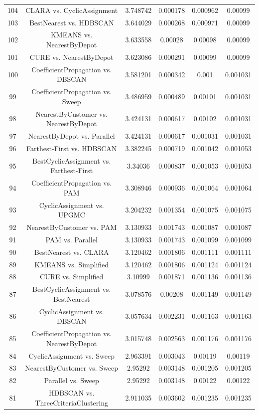 \documentclass[a4paper,10pt]{article}
\begin{document}
\begin{landscape}
\begin{table}[!htp]
\begin{tabular}{cccccc}
104&CLARA vs. CyclicAssignment&3.748742&0.000178&0.000962&0.00099\\
103&BestNearest vs. HDBSCAN&3.644029&0.000268&0.000971&0.00099\\
102&KMEANS vs. NearestByDepot&3.633558&0.00028&0.00098&0.00099\\
101&CURE vs. NearestByDepot&3.623086&0.000291&0.00099&0.00099\\
100&CoefficientPropagation vs. DBSCAN&3.581201&0.000342&0.001&0.001031\\
99&CoefficientPropagation vs. Sweep&3.486959&0.000489&0.00101&0.001031\\
98&NearestByCustomer vs. NearestByDepot&3.424131&0.000617&0.00102&0.001031\\
97&NearestByDepot vs. Parallel&3.424131&0.000617&0.001031&0.001031\\
96&Farthest-First vs. HDBSCAN&3.382245&0.000719&0.001042&0.001053\\
95&BestCyclicAssignment vs. Farthest-First&3.34036&0.000837&0.001053&0.001053\\
94&CoefficientPropagation vs. PAM&3.308946&0.000936&0.001064&0.001064\\
93&CyclicAssignment vs. UPGMC&3.204232&0.001354&0.001075&0.001075\\
92&NearestByCustomer vs. PAM&3.130933&0.001743&0.001087&0.001087\\
91&PAM vs. Parallel&3.130933&0.001743&0.001099&0.001099\\
90&BestNearest vs. CLARA&3.120462&0.001806&0.001111&0.001111\\
89&KMEANS vs. Simplified&3.120462&0.001806&0.001124&0.001124\\
88&CURE vs. Simplified&3.10999&0.001871&0.001136&0.001136\\
87&BestCyclicAssignment vs. BestNearest&3.078576&0.00208&0.001149&0.001149\\
86&CyclicAssignment vs. DBSCAN&3.057634&0.002231&0.001163&0.001163\\
85&CoefficientPropagation vs. NearestByDepot&3.015748&0.002563&0.001176&0.001176\\
84&CyclicAssignment vs. Sweep&2.963391&0.003043&0.00119&0.00119\\
83&NearestByCustomer vs. Sweep&2.95292&0.003148&0.001205&0.001205\\
82&Parallel vs. Sweep&2.95292&0.003148&0.00122&0.00122\\
81&HDBSCAN vs. ThreeCriteriaClustering&2.911035&0.003602&0.001235&0.001235\\

\end{tabular}
\end{table}
\end{landscape}
\end{document}

